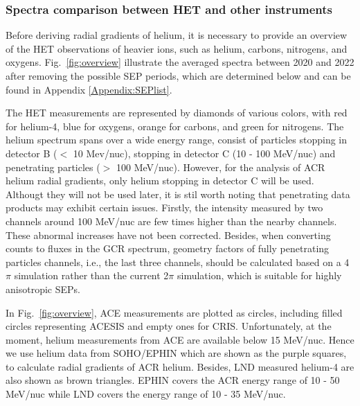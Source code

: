 \subsubsection*{Spectra comparison between \ac{HET} and other instruments}
Before deriving radial gradients of helium, it is necessary to provide an overview of the \ac{HET} observations of heavier ions, such as helium, carbons, nitrogens, and oxygens. Fig.~\ref{fig:overview} illustrate the averaged spectra between 2020 and 2022 after removing the possible \ac{SEP} periods, which are determined below and can be found in Appendix \ref{Appendix:SEPlist}.


The \ac{HET} measurements are represented by diamonds of various colors, with red for helium-4, blue for oxygens, orange for carbons, and green for nitrogens.
The helium spectrum spans over a wide energy range, consist of particles stopping in detector B ($<$ 10 Mev/nuc), stopping in detector C (10 - 100 MeV/nuc) and penetrating particles ($>$ 100 MeV/nuc). 
However, for the analysis of \ac{ACR} helium radial gradients, only helium stopping in detector C will be used.
Althougt they will not be used later, it is stil worth noting that penetrating data products may exhibit certain issues. 
Firstly, the intensity measured by two channels around 100 MeV/nuc are few times higher than the nearby channels. These abnormal increases have not been corrected.
Besides, when converting counts to fluxes in the \ac{GCR} spectrum, geometry factors of fully penetrating particles channels, i.e., the last three channels, should be calculated based on a 4$\pi$ simulation rather than the current 2$\pi$ simulation, which is suitable for highly anisotropic \acp{SEP}.


In Fig.~\ref{fig:overview}, \ac{ACE} measurements are plotted as circles, including filled circles representing \ac{ACESIS} and empty ones for \ac{CRIS}. Unfortunately, at the moment, helium measurements from \ac{ACE} are available below 15 MeV/nuc. Hence we use helium data from \ac{SOHO}/\ac{EPHIN} which are shown as the purple squares, to calculate radial gradients of \ac{ACR} helium. Besides, \ac{LND} measured helium-4 are also shown as brown triangles. \ac{EPHIN} covers the \ac{ACR} energy range of 10 - 50 MeV/nuc while \ac{LND} covers the energy range of 10 - 35 MeV/nuc.

